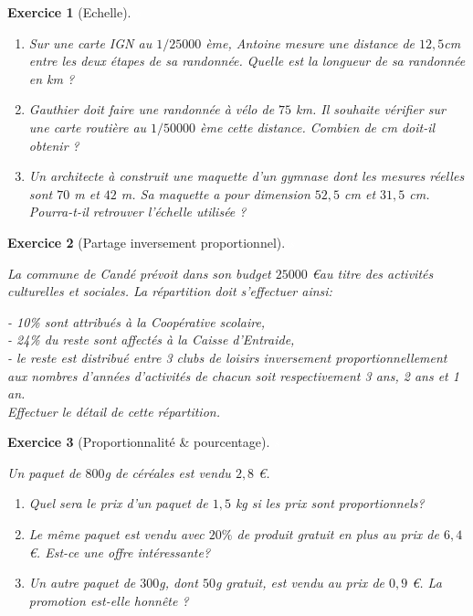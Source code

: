 \documentclass [10pt,a4paper] {article}
\def\ben{\begin{enumerate}}
\def\een{\end{enumerate}}
\newtheorem{exo}{Exercice}
\begin{document}
\vspace{0.25cm}

\begin{exo}[Echelle]
\textcolor{white}{s}

\ben
\item Sur une carte IGN au $1/25 000$ ème, Antoine mesure une distance de $12,5$cm
entre les deux étapes de sa randonnée. Quelle est la longueur de sa randonnée en km ?
\item  Gauthier doit faire une randonnée à vélo de $75$ km. Il souhaite vérifier sur
une carte routière au $1/50 000$ ème cette distance. Combien de cm doit-il
obtenir ?
\item Un architecte à construit une maquette d’un gymnase dont les mesures
réelles sont $70$ m et $42$ m. Sa maquette a pour dimension $52,5$ cm et $31,5$ cm.
Pourra-t-il retrouver l’échelle utilisée ?
\een
\end{exo}

\vspace{0.25cm}

\begin{exo}[Partage inversement proportionnel]
\textcolor{white}{s}

La commune de Candé prévoit dans son budget $25 000$ \euro au titre des activités
culturelles et sociales. La répartition doit s'effectuer ainsi:

- 10\% sont attribués à la Coopérative scolaire,\\
- 24\% du reste sont affectés à la Caisse d'Entraide,\\
- le reste est distribué entre 3 clubs de loisirs inversement
proportionnellement aux nombres d'années d'activités de chacun soit
respectivement 3 ans, 2 ans et 1 an.\\

Effectuer le détail de cette répartition.
\end{exo}

\vspace{0.25cm}

\begin{exo}[Proportionnalité \& pourcentage]

\textcolor{white}{s}

Un paquet de $800$g de céréales est vendu $2,8$ \euro.
\ben
\item Quel sera le prix d'un paquet de $1,5$ kg si les prix sont proportionnels?
\item Le même paquet est vendu avec $20\%$ de produit gratuit en plus au prix de $6,4$ \euro. Est-ce une offre intéressante?
\item Un autre paquet de $300$g, dont $50$g gratuit, est vendu au prix de $0,9$ \euro.
La promotion est-elle honnête ?
\een
\end{exo}
\end{document}
